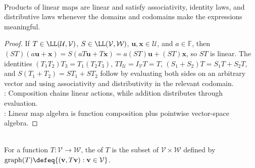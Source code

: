 \begin{proposition} \label{prop:linear-map-product-algebra} \\
Products of linear maps are linear and satisfy associativity, identity laws, and distributive laws whenever the domains and codomains make the expressions meaningful.
\begin{proof}
If $T\in\LL(\mathcal{U},\mathcal{V})$, $S\in\LL(\mathcal{V},\mathcal{W})$, $\mathbf{u},\mathbf{x}\in\mathcal{U}$, and $a\in\mathbb{F}$, then $(ST)(a\mathbf{u}+\mathbf{x})=S(aT\mathbf{u}+T\mathbf{x})=a(ST)\mathbf{u}+(ST)\mathbf{x}$, so $ST$ is linear. The identities $(T_1T_2)T_3=T_1(T_2T_3)$, $TI_{\mathcal{U}}=I_{\mathcal{V}}T=T$, $(S_1+S_2)T=S_1T+S_2T$, and $S(T_1+T_2)=ST_1+ST_2$ follow by evaluating both sides on an arbitrary vector and using associativity and distributivity in the relevant codomain.\\
: Composition chains linear actions, while addition distributes through evaluation.\\
: Linear map algebra is function composition plus pointwise vector-space algebra.
\end{proof}
\end{proposition}

\begin{definition} \\
For a function $T:\mathcal{V}\to\mathcal{W}$, the  of $T$ is the subset of $\mathcal{V}\times\mathcal{W}$ defined by $\operatorname{graph}(T)\defeq\{(\mathbf{v},T\mathbf{v}):\mathbf{v}\in\mathcal{V}\}$.
\end{definition}

